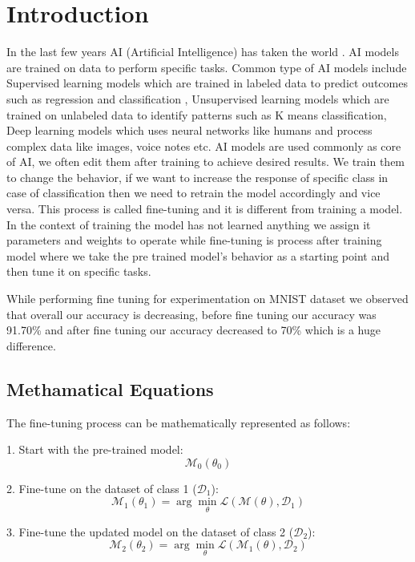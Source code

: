 \documentclass[conference]{IEEEtran}
\begin{document}
\section{Introduction}
In the last few years AI (Artificial Intelligence) has taken the world \cite{homer_simpson}. AI models are trained on data to perform specific tasks. Common type of AI models include Supervised learning models which are trained in labeled data to predict outcomes such as regression and classification , Unsupervised learning models  which are trained on unlabeled data to identify patterns such as K means classification, Deep learning models which uses neural networks like humans and process complex data like images, voice notes etc. AI models are used commonly as core of AI, we often edit them after training to achieve desired results. We train them to change the behavior, if we want to increase the response of specific class in case of classification then we need to retrain the model accordingly and vice versa. This process is called fine-tuning and it is different from training a model. In the context of training the model has not learned anything we assign it parameters and weights to operate while fine-tuning is process after training model where we take the pre trained model’s behavior as a starting point and then tune it on specific tasks. 

While performing fine tuning for experimentation on MNIST dataset we observed that overall our accuracy is decreasing, before fine tuning our accuracy was 91.70\% and after fine tuning our accuracy decreased to 70\% which is a huge difference.


\subsection{Methamatical Equations}
The fine-tuning process can be mathematically represented as follows:

1. Start with the pre-trained model:
\begin{equation}
\mathcal{M}_0(\theta_0)
\end{equation}

2. Fine-tune on the dataset of class 1 (\( \mathcal{D}_1 \)):
\begin{equation}
\mathcal{M}_1(\theta_1) = \arg \min_{\theta} \mathcal{L}(\mathcal{M}(\theta), \mathcal{D}_1)
\end{equation}

3. Fine-tune the updated model on the dataset of class 2 (\( \mathcal{D}_2 \)):
\begin{equation}
\mathcal{M}_2(\theta_2) = \arg \min_{\theta} \mathcal{L}(\mathcal{M}_1(\theta), \mathcal{D}_2)
\end{equation}
\end{document}
